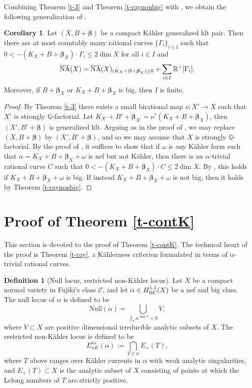\documentclass[11pt]{amsart}
\numberwithin{equation}{section}
\def\bbeta{\boldsymbol{\beta}}
\def\dim{\operatorname{dim}}
\newcommand\Q{{\mathbb{Q}}}
\theoremstyle{definition}
\theoremstyle{definition}
\newtheorem{corollary}[theorem]{Corollary}
\theoremstyle{definition}
\newtheorem{definition}[theorem]{Definition}
\begin{document}
Combining Theorem \ref{t-3} and Theorem \ref{t-raynonbig} with \cite{HP24}, we obtain the following generalization of \cite[Theorem 0.5]{HP24}.
\begin{corollary}\label{c-conetheorem} Let $(X,B+\bbeta )$ be a  compact K\"ahler generalized klt pair. Then there are at most countably many rational curves $\{\Gamma _i\}_{i\in I}$ such that $0<-(K_X+B+\bbeta _X)\cdot \Gamma _i\leq 2\dim X$ for all $i\in I$ and  \[\overline{\rm NA}(X)=\overline{\rm NA}(X)_{(K_X+B+\bbeta _X) \geq 0}+\sum _{i\in I}\mathbb R ^+[\Gamma _i].\]
Moreover, if $B+\bbeta _X$ or $K_X+B+\bbeta _X$ is big, then $I$ is finite.
\end{corollary}
\begin{proof} By Theorem \ref{t-3} there exists
a small birational map $\nu : X' \to X$ such that $X'$ is strongly $\Q$-factorial. Let $K_{X'}+B'+\bbeta _{X'}=\nu ^*(K_X+B+\bbeta_X)$, then $(X',B'+\bbeta)$ is generalized klt. Arguing as in the proof of \cite[Corollary 5.3]{DHP24}, we may replace $(X,B+\bbeta)$ by $(X',B'+\bbeta)$, and so we may assume that $X$ is strongly $\Q$-factorial.
By the proof of \cite[Theorem 3.1, Corollary 3.2]{HP24}, it suffices to show that if $\omega$ is any K\"ahler form such that $\alpha=K_X+B+\bbeta _X+\omega$ is nef but not K\"ahler, then there is
an $\alpha$-trivial rational curve $C$ such that $0<-(K_X+B+\bbeta _X)\cdot C\leq 2\dim X$.
By \cite[Theorem 3.1]{HP24}, this holds if $K_{X}+B+\bbeta _{X}+\omega$ is big. If instead $K_{X}+B+\bbeta _{X}+\omega$ is not big, then it holds by Theorem \ref{t-raynonbig}.  
\end{proof}
\section{Proof of Theorem \ref{t-contK}}

This section is devoted to the proof of Theorem \ref{t-contK}. The technical heart of the proof is Theorem \ref{t-ray}, a K\"ahlerness criterion formulated in terms of $\alpha$-trivial rational curves.

\begin{definition}[Null locus, restricted non-K\"ahler locus]
Let $X$ be a compact normal variety in Fujiki's class $\mathcal{C}$, and let $\alpha \in H^{1,1}_{\rm{BC}}(X)$ be a nef and big class. The null locus of $\alpha$ is defined to be
$$\text{Null}(\alpha) = \bigcup_{\int_{V} \alpha^{\dim V} = 0} V,$$
where $V \subset X$ are positive dimensional irreducible analytic subsets of $X$. The restricted non-K\"ahler locus is defined to be
$$
E_{n K}^{a s}(\alpha):=\bigcap_{T \in \alpha} E_{+}(T),
$$
where $T$ above ranges over K\"ahler currents in $\alpha$ with weak analytic singularities, and $E_{+}(T) \subset X$ is the analytic subset of $X$ consisting of points at which the Lelong numbers of $T$ are strictly positive.
\end{definition}
\end{document}
